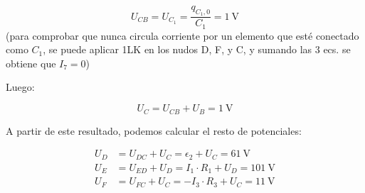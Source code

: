 \begin{equation*}
  U_{CB} = U_{C_1} = \frac{q_{C_1,0}}{C_1} = \qty{1}{\volt}
\end{equation*}
(para comprobar que nunca circula corriente por un elemento que esté conectado como $C_1$, se puede aplicar 1LK en los nudos D, F, y C, y sumando las 3 ecs. se obtiene que $I_7 = 0$)

\vspace{3mm}
Luego:

\vspace{-3mm}
\begin{equation*}
  U_C = U_{CB} + U_B = \qty{1}{\volt}
\end{equation*}

\vspace{2mm}
A partir de este resultado, podemos calcular el resto de potenciales:

\vspace{-3mm}
\begin{align*}
  U_D &= U_{DC} + U_C = \epsilon_2 + U_C = \qty{61}{\volt}\\
  U_E &= U_{ED} + U_D = I_1 \cdot R_1 + U_D = \qty{101}{\volt}\\
  U_F &= U_{FC} + U_C = -I_3 \cdot R_3 + U_C = \qty{11}{\volt}
\end{align*}

